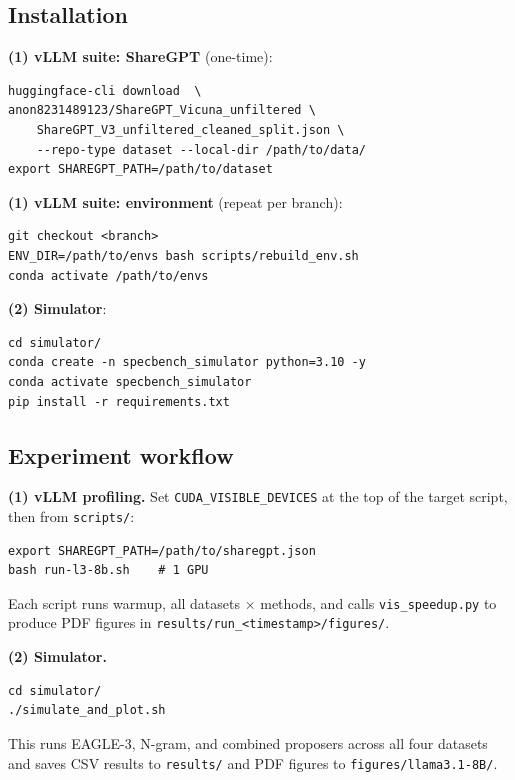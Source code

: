\subsection{Installation}
\label{sec:ae-install}

\textbf{(1) vLLM suite: ShareGPT} (one-time):
\begin{verbatim}
huggingface-cli download  \
anon8231489123/ShareGPT_Vicuna_unfiltered \
    ShareGPT_V3_unfiltered_cleaned_split.json \
    --repo-type dataset --local-dir /path/to/data/
export SHAREGPT_PATH=/path/to/dataset
\end{verbatim}

\textbf{(1) vLLM suite: environment} (repeat per branch):
\begin{verbatim}
git checkout <branch>
ENV_DIR=/path/to/envs bash scripts/rebuild_env.sh
conda activate /path/to/envs
\end{verbatim}

\textbf{(2) Simulator}:
\begin{verbatim}
cd simulator/
conda create -n specbench_simulator python=3.10 -y
conda activate specbench_simulator
pip install -r requirements.txt
\end{verbatim}

\subsection{Experiment workflow}

\textbf{(1) vLLM profiling.}
Set \texttt{CUDA\_VISIBLE\_DEVICES} at the top of the target script,
then from \texttt{scripts/}:
\begin{verbatim}
export SHAREGPT_PATH=/path/to/sharegpt.json
bash run-l3-8b.sh    # 1 GPU
\end{verbatim}
Each script runs warmup, all datasets $\times$ methods, and calls
\texttt{vis\_speedup.py} to produce PDF figures in
\texttt{results/run\_<timestamp>/figures/}.

\textbf{(2) Simulator.}
\begin{verbatim}
cd simulator/
./simulate_and_plot.sh
\end{verbatim}
This runs EAGLE-3, N-gram, and combined proposers across all four
datasets and saves CSV results to \texttt{results/} and PDF figures to
\texttt{figures/llama3.1-8B/}.


